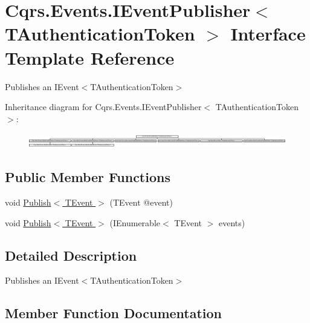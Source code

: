\hypertarget{interfaceCqrs_1_1Events_1_1IEventPublisher}{}\section{Cqrs.\+Events.\+I\+Event\+Publisher$<$ T\+Authentication\+Token $>$ Interface Template Reference}
\label{interfaceCqrs_1_1Events_1_1IEventPublisher}


Publishes an I\+Event$<$\+T\+Authentication\+Token$>$  


Inheritance diagram for Cqrs.\+Events.\+I\+Event\+Publisher$<$ T\+Authentication\+Token $>$\+:\begin{figure}[H]
\begin{center}
\leavevmode
\includegraphics[height=0.633484cm]{interfaceCqrs_1_1Events_1_1IEventPublisher}
\end{center}
\end{figure}
\subsection*{Public Member Functions}
\begin{DoxyCompactItemize}
\item 
void \hyperlink{interfaceCqrs_1_1Events_1_1IEventPublisher_a02f0db0bc9b3aa1c7f766f58f8422ee3_a02f0db0bc9b3aa1c7f766f58f8422ee3}{Publish$<$ T\+Event $>$} (T\+Event @event)
\item 
void \hyperlink{interfaceCqrs_1_1Events_1_1IEventPublisher_a2cbcc3d2c24d015abef6337714ec51ff_a2cbcc3d2c24d015abef6337714ec51ff}{Publish$<$ T\+Event $>$} (I\+Enumerable$<$ T\+Event $>$ events)
\end{DoxyCompactItemize}


\subsection{Detailed Description}
Publishes an I\+Event$<$\+T\+Authentication\+Token$>$ 



\subsection{Member Function Documentation}
\mbox{\label{interfaceCqrs_1_1Events_1_1IEventPublisher_a02f0db0bc9b3aa1c7f766f58f8422ee3_a02f0db0bc9b3aa1c7f766f58f8422ee3}} 
